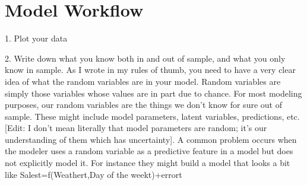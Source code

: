\section*{Model Workflow}

1. Plot your data

2. Write down what you know both in and out of sample, and what you only know in sample.
As I wrote in my rules of thumb, you need to have a very clear idea of what the random variables are in your model. Random variables are simply those variables whose values are in part due to chance. For most modeling purposes, our random variables are the things we don’t know for sure out of sample. These might include model parameters, latent variables, predictions, etc. [Edit: I don't mean literally that model parameters are random; it's our understanding of them which has uncertainty].
A common problem occurs when the modeler uses a random variable as a predictive feature in a model but does not explicitly model it. For instance they might build a model that looks a bit like
Salest=f(Weathert,Day of the weekt)+errort

